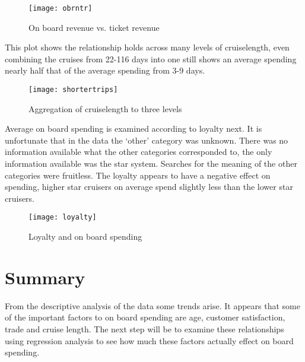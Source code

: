 \documentclass[twoside,twocolumn]{article}
\begin{document}
\begin{figure}[H]
	\centering 
	\texttt{[image: obrntr]}
	\caption{On board revenue vs. ticket revenue}
\end{figure}

This plot shows the relationship holds across many levels of cruiselength, even combining the cruises from 22-116 days into one still shows an average spending nearly half that of the average spending from 3-9 days. 

\begin{figure}[H]
	\centering 
	\texttt{[image: shortertrips]}
	\caption{Aggregation of cruiselength to three levels}
\end{figure}

Average on board spending is examined according to loyalty next. It is unfortunate that in the data the `other' category was unknown. There was no information available what the other categories corresponded to, the only information available was the star system. Searches for the meaning of the other categories were fruitless. The loyalty appears to have a negative effect on spending, higher star cruisers on average spend slightly less than the lower star cruisers. 

\begin{figure}[H]
	\centering 
	\texttt{[image: loyalty]}
	\caption{Loyalty and on board spending}
\end{figure}

\section{Summary}
From the descriptive analysis of the data some trends arise. It appears that some of the important factors to on board spending are age, customer satisfaction, trade and cruise length. The next step will be to examine these relationships using regression analysis to see how much these factors actually effect on board spending. 
\end{document}
